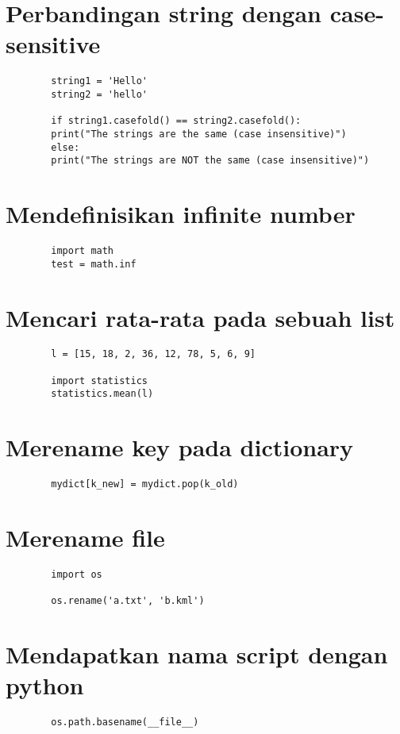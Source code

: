 \documentclass{article}
\begin{document}
	\section {Perbandingan string dengan case-sensitive}
	\begin{lstlisting}
		string1 = 'Hello'
		string2 = 'hello'
		
		if string1.casefold() == string2.casefold():
		print("The strings are the same (case insensitive)")
		else:
		print("The strings are NOT the same (case insensitive)")
	\end{lstlisting}
	
	\section {Mendefinisikan infinite number}
	\begin{lstlisting}
		import math
		test = math.inf
	\end{lstlisting}
	
	\section {Mencari rata-rata pada sebuah list}
	\begin{lstlisting}
		l = [15, 18, 2, 36, 12, 78, 5, 6, 9]
		
		import statistics
		statistics.mean(l)
	\end{lstlisting}
	
	\section {Merename key pada dictionary}
	\begin{lstlisting}
		mydict[k_new] = mydict.pop(k_old)
	\end{lstlisting}
	
	\section {Merename file}
	\begin{lstlisting}
		import os
		
		os.rename('a.txt', 'b.kml')
	\end{lstlisting}
	
	\section {Mendapatkan nama script dengan python}
	\begin{lstlisting}
		os.path.basename(__file__)
	\end{lstlisting}
	
\end{document}
